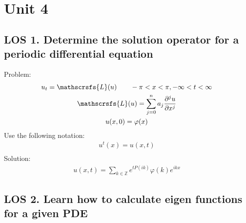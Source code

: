 \documentclass[12pt, a4paper]{article}
\begin{document}
\section*{Unit 4}
\vspace{1em}

\subsection*{LOS 1. Determine the solution operator for a periodic differential equation}
\vspace{0.3em}
Problem:
\begin{gather*}
    u_t = \mathscrsfs{L}(u) \qquad -\pi<x<\pi, -\infty<t<\infty\\
    \mathscrsfs{L}(u)= \sum_{j=0}^{n} a_j \frac{\partial^j u}{\partial x^j}\\
    u(x, 0) = \varphi(x)\\
\end{gather*}
Use the following notation:
\begin{gather*}
    u^t(x) = u(x, t) \\
\end{gather*}
Solution:
\begin{gather*}
    u(x, t) = \sum_{k \in \mathbb{Z}} e^{tP(ik)}\hat{\varphi}(k)e^{ikx}
\end{gather*}
\vspace{0.3em}

\subsection*{LOS 2. Learn how to calculate eigen functions for a given PDE}
\end{document}
